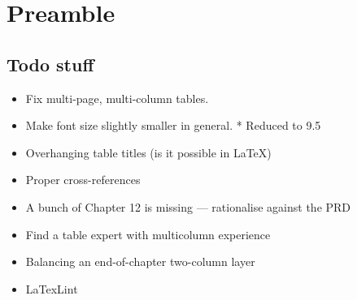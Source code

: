 \chapter*{Preamble}
\section{Todo stuff}
\begin{itemize}
 \item Fix multi-page, multi-column tables.
 \item Make font size slightly smaller in general. * Reduced to 9.5
 \item Overhanging table titles (is it possible in \LaTeX )
 \item Proper cross-references
 \item A bunch of Chapter 12 is missing --- rationalise against the PRD
\end{itemize}

\begin{itemize}
 \item Find a table expert with multicolumn experience
 \item Balancing an end-of-chapter two-column layer
 \item LaTexLint
\end{itemize}

